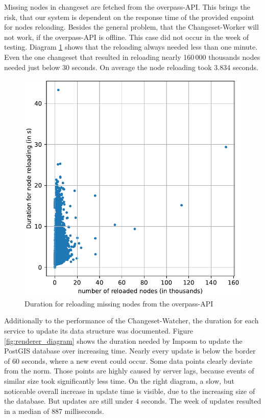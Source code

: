 \documentclass[conference]{IEEEtran}
\begin{document}
Missing nodes in changeset are fetched from the overpass-API. This brings the risk, that our system is dependent on the response time of the provided enpoint for nodes reloading. Besides the general problem, that the Changeset-Worker will not work, if the overpass-API is offline. This case did not occur in the week of testing. Diagram \ref{fig:reloading_nodes_statistic} shows that the reloading always needed less than one minute. Even the one changeset that resulted in reloading nearly 160\,000 thousands nodes needed just below 30 seconds. On average the node reloading took 3.834 seconds.
\begin{figure}[h]
    \centering
    \includegraphics[width=\textwidth/2-2cm]{figures/reloaded_nodes_statistic.pdf}
    \caption{Duration for reloading missing nodes from the overpass-API}
    \label{fig:reloading_nodes_statistic}
\end{figure}

Additionally to the performance of the Changeset-Watcher, the duration for each service to update its data structure was documented. Figure \ref{fig:renderer_diagram} shows the duration needed by Imposm to update the PostGIS database over increasing time. Nearly every update is below the border of $60$ seconds, where a new event could occur. Some data points clearly deviate from the norm. Those points are highly caused by server lags, because events of similar size took significantly less time. On the right diagram, a slow, but noticeable overall increase in update time is visible, due to the increasing size of the database. But updates are still under $4$ seconds. The week of updates resulted in a median of 887 milliseconds.
\end{document}
